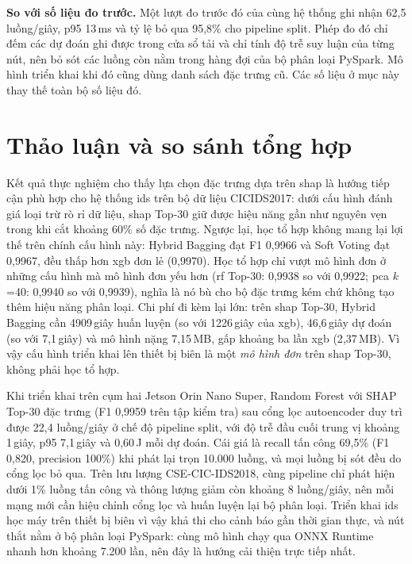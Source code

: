 \textbf{So với số liệu đo trước.} Một lượt đo trước đó của cùng hệ thống ghi nhận 62{,}5 luồng/giây, p95 13\,ms và tỷ lệ bỏ qua 95{,}8\% cho pipeline split. Phép đo đó chỉ đếm các dự đoán ghi được trong cửa sổ tải và chỉ tính độ trễ suy luận của từng nút, nên bỏ sót các luồng còn nằm trong hàng đợi của bộ phân loại PySpark. Mô hình triển khai khi đó cũng dùng danh sách đặc trưng cũ. Các số liệu ở mục này thay thế toàn bộ số liệu đó.

\section{Thảo luận và so sánh tổng hợp}
Kết quả thực nghiệm cho thấy lựa chọn đặc trưng dựa trên \ac{shap} là hướng tiếp cận phù hợp cho hệ thống \ac{ids} trên bộ dữ liệu CICIDS2017: dưới cấu hình đánh giá loại trừ rò rỉ dữ liệu, \ac{shap} Top-30 giữ được hiệu năng gần như nguyên vẹn trong khi cắt khoảng 60\% số đặc trưng. Ngược lại, học tổ hợp không mang lại lợi thế trên chính cấu hình này: Hybrid Bagging đạt F1 0{,}9966 và Soft Voting đạt 0{,}9967, đều thấp hơn \ac{xgb} đơn lẻ (0{,}9970). Học tổ hợp chỉ vượt mô hình đơn ở những cấu hình mà mô hình đơn yếu hơn (\ac{rf} Top-30: 0{,}9938 so với 0{,}9922; \ac{pca} $k$=40: 0{,}9940 so với 0{,}9939), nghĩa là nó bù cho bộ đặc trưng kém chứ không tạo thêm hiệu năng phân loại. Chi phí đi kèm lại lớn: trên \ac{shap} Top-30, Hybrid Bagging cần 4909\,giây huấn luyện (so với 1226\,giây của \ac{xgb}), 46{,}6\,giây dự đoán (so với 7{,}1\,giây) và mô hình nặng 7{,}15\,MB, gấp khoảng ba lần \ac{xgb} (2{,}37\,MB). Vì vậy cấu hình triển khai lên thiết bị biên là một \emph{mô hình đơn} trên \ac{shap} Top-30, không phải học tổ hợp.

Khi triển khai trên cụm hai Jetson Orin Nano Super, Random Forest với SHAP Top-30 đặc trưng (F1 0{,}9959 trên tập kiểm tra) sau cổng lọc autoencoder duy trì được 22{,}4 luồng/giây ở chế độ pipeline split, với độ trễ đầu cuối trung vị khoảng 1\,giây, p95 7{,}1\,giây và 0{,}60\,J mỗi dự đoán. Cái giá là recall tấn công 69{,}5\% (F1 0{,}820, precision 100\%) khi phát lại trọn 10.000 luồng, và mọi luồng bị sót đều do cổng lọc bỏ qua. Trên lưu lượng CSE-CIC-IDS2018, cùng pipeline chỉ phát hiện dưới 1\% luồng tấn công và thông lượng giảm còn khoảng 8 luồng/giây, nên mỗi mạng mới cần hiệu chỉnh cổng lọc và huấn luyện lại bộ phân loại. Triển khai \ac{ids} học máy trên thiết bị biên vì vậy khả thi cho cảnh báo gần thời gian thực, và nút thắt nằm ở bộ phân loại PySpark: cùng mô hình chạy qua ONNX Runtime nhanh hơn khoảng 7.200 lần, nên đây là hướng cải thiện trực tiếp nhất.




